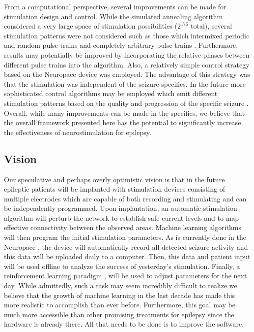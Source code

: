 \documentclass[11pt,a4paper,final]{article}
\begin{document}
From a computational perspective, several improvements can be made for stimulation design and control.
While the simulated annealing algorithm considered a very large space of stimulation possibilities ($2^{176}$ total), several stimulation patterns were not considered such as those which intermixed periodic and random pulse trains and completely arbitrary pulse trains \citep{grill14patent2}.
Furthermore, results may potentially be improved by incorporating the relative phases between different pulse trains into the algorithm.
Also, a relatively simple control strategy based on the Neuropace device was employed.
The advantage of this strategy was that the stimulation was independent of the seizure specifics.
In the future more sophisticated control algorithms may be employed which emit different stimulation patterns based on the quality and progression of the specific seizure \citep{ching12,zalay13,kalitzin14,ehrens15}.
Overall, while many improvements can be made in the specifics, we believe that the overall framework presented here has the potential to significantly increase the effectiveness of neurostimulation for epilepsy.

\subsection{Vision}

Our speculative and perhaps overly optimistic vision is that in the future epileptic patients will be implanted with stimulation devices consisting of multiple electrodes which are capable of both recording and stimulating \citep{ryapolova14} and can be independently programmed.
Upon implantation, an automatic stimulation algorithm will perturb the network to establish safe current levels and to map effective connectivity between the observed areas.
Machine learning algorithms will then program the initial stimulation parameters.
As is currently done in the Neuropace \citep{NP}, the device will automatically record all detected seizure activity and this data will be uploaded daily to a computer.
Then, this data and patient input will be used offline to analyze the success of yesterday's stimulation.
Finally, a reinforcement learning paradigm \citep{gosavi14}, will be used to adjust parameters for the next day.
While admittedly, such a task may seem incredibly difficult to realize we believe that the growth of machine learning in the last decade has made this more realistic to accomplish than ever before.
Furthermore, this goal may be much more accessible than other promising treatments for epilepsy since the hardware is already there.
All that needs to be done is to improve the software.
\end{document}

